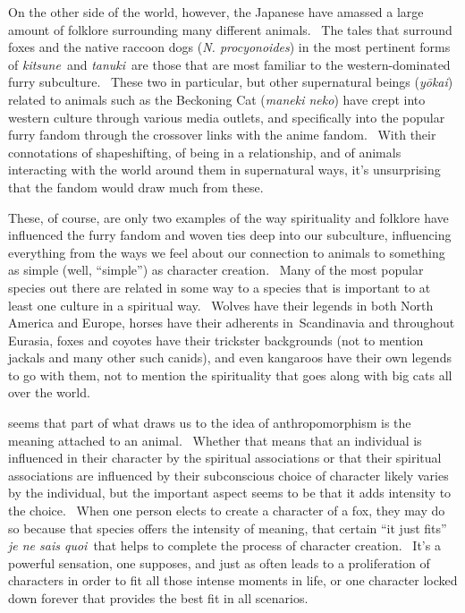 On the other side of the world, however, the Japanese have amassed a
large amount of folklore surrounding many different animals. ~The tales
that surround foxes and the native raccoon dogs (\emph{N. procyonoides})
in the most pertinent forms of \emph{kitsune}~and \emph{tanuki}~are
those that are most familiar to the western-dominated furry subculture.
~These two in particular, but other supernatural beings (\emph{yōkai})
related to animals such as the Beckoning Cat (\emph{maneki neko}) have
crept into western culture through various media outlets, and
specifically into the popular furry fandom through the crossover links
with the anime fandom. ~With their connotations of shapeshifting, of
being in a relationship, and of animals interacting with the world
around them in supernatural ways, it's unsurprising that the fandom
would draw much from these.

These, of course, are only two examples of the way spirituality and
folklore have influenced the furry fandom and woven ties deep into our
subculture, influencing everything from the ways we feel about our
connection to animals to something as simple (well, ``simple'') as
character creation. ~Many of the most popular species out there are
related in some way to a species that is important to at least one
culture in a spiritual way. ~Wolves have their legends in both North
America and Europe, horses have their adherents in~Scandinavia and
throughout Eurasia, foxes and coyotes have their trickster backgrounds
(not to mention jackals and many other such canids), and even kangaroos
have their own legends to go with them, not to mention the spirituality
that goes along with big cats all over the world.

\It seems that part of what draws us to the idea of anthropomorphism is
the meaning attached to an animal. ~Whether that means that an
individual is influenced in their character by the spiritual
associations or that their spiritual associations are influenced by
their subconscious choice of character likely varies by the individual,
but the important aspect seems to be that it adds intensity to the
choice. ~When one person elects to create a character of a fox, they may
do so because that species offers the intensity of meaning, that certain
``it just fits'' \emph{je ne sais quoi}~that helps to complete the
process of character creation. ~It's a powerful sensation, one supposes,
and just as often leads to a proliferation of characters in order to fit
all those intense moments in life, or one character locked down forever
that provides the best fit in all scenarios.

